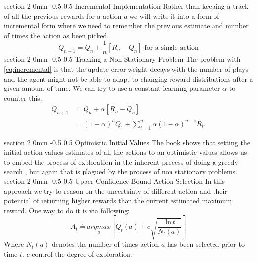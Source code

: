 \documentclass[twocolumn,11pt]{article}
\makeatletter
\renewcommand{\section}{\@startsection
{section}%
{2}%
{0mm}%
{-0.5\baselineskip}%
{0.5\baselineskip}%
{\bfseries\color{blue}}} %
\makeatother
\begin{document}
\section{Incremental Implementation}
Rather than keeping a track of all the previous rewards for a action $a$ we will write it into a form of incremental form where we need to remember the previous estimate and number of times the action as been picked.\useshortskip
\begin{equation}\label{eq:incremental}
    Q_{n+1} = Q_n + \dfrac{1}{n}[R_n - Q_n] \text{ for a single action}
\end{equation}
\section{Tracking a Non Stationary Problem}
The problem with \ref{eq:incremental} is that the update error weight decays with the number of plays and the agent might not be able to adapt to changing reward distributions after a given amount of time. We can try to use a constant learning parameter $\alpha$ to counter this.
\begin{equation}
    \begin{split}
        Q_{n+1} &\doteq Q_n + \alpha[R_n - Q_n]\\
        &= (1 - \alpha)^n Q_1 + \sum_{i=1}^{n}\alpha(1 -\alpha)^{n-i}R_i.
    \end{split}
\end{equation}


\section{Optimistic Initial Values}
The book \cite{sutton2018reinforcement} shows that setting the initial action values estimates of all the actions to an optimistic values allows us to embed the process of exploration in the inherent process of doing a greedy search , but again that is plagued by the process of non stationary problems.
\section{Upper-Confidence-Bound Action Selection }
In this approach we try to reason on the uncertainty of different action and their potential of returning higher rewards than the current estimated maximum reward. One way to do it is via following:\useshortskip
\begin{equation}
    A_t \doteq \underset{a}{argmax}[Q_t(a) + c\sqrt{\dfrac{\ln{t}}{N_t(a)}}]
\end{equation}
Where $N_t(a)$ denotes the number of times action $a$ has been selected prior to time $t$. $c $ control the degree of exploration.
\end{document}
